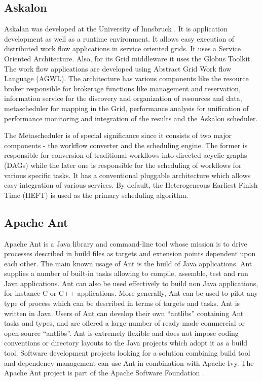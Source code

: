 \subsection{ Askalon}

     Askalan was developed at the University of Innsbruck \cite{RMBDP-Book}.  
     It is application development as well as a runtime
     environment. It allows easy execution of distributed work flow
     applications in service oriented grids. It uses a Service
     Oriented Architecture. Also, for its Grid middleware it uses the
     Globus Toolkit. The work flow applications are developed using
     Abstract Grid Work flow Language (AGWL). The architecture has
     various components like the resource broker responsible for
     brokerage functions like management and reservation, information
     service for the discovery and organization of resources and data,
     metascheduler for mapping in the Grid, performance analysis for
     unification of performance monitoring and integration of the
     results and the Askalon scheduler.

     The Metascheduler is of special significance since it consists of
     two major components - the workflow converter and the scheduling
     engine. The former is responsible for conversion of traditional
     workflows into directed acyclic graphs (DAGs) while the later one is
     responsible for the scheduling of workflows for various specific
     tasks. It has a conventional pluggable architecture which allows easy
     integration of various services. By default, the Heterogeneous
     Earliest Finish Time (HEFT) is used as the primary scheduling
     algorithm.

\subsection{ Apache Ant}

     Apache Ant is a Java library and command-line tool whose mission
     is to drive processes described in build files as targets and
     extension points dependent upon each other. The main known usage
     of Ant is the build of Java applications. Ant supplies a number
     of built-in tasks allowing to compile, assemble, test and run
     Java applications. Ant can also be used effectively to build non
     Java applications, for instance C or C++ applications. More
     generally, Ant can be used to pilot any type of process which can
     be described in terms of targets and tasks. Ant is written in
     Java. Users of Ant can develop their own ``antlibs'' containing Ant
     tasks and types, and are offered a large number of ready-made
     commercial or open-source ``antlibs''. Ant is extremely flexible
     and does not impose coding conventions or directory layouts to
     the Java projects which adopt it as a build tool. Software
     development projects looking for a solution combining build tool
     and dependency management can use Ant in combination with Apache
     Ivy. The Apache Ant project is part of the Apache Software
     Foundation \cite{ant-www}.


